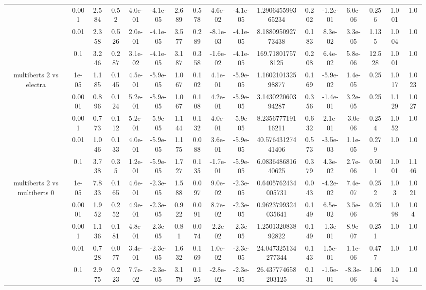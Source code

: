 \begin{tabular}{|c|c|c|c|c|c|c|c|c|c|c|c|c|c|c|c|c|}
 & 0.001 & 2.584 & 0.52 & 4.0e-01 & -4.1e-05 & 2.689 & 0.578 & 4.6e-02 & -4.1e-05 & 1.290645599365234 & 0.202 & -1.2e-01 & 6.0e-06 & 0.256 & 1.001 & 1.0 \\
 & 0.01 & 2.358 & 0.526 & 2.0e-01 & -4.1e-05 & 3.577 & 0.289 & -8.1e-03 & -4.1e-05 & 8.188095092773438 & 0.183 & 8.3e-02 & 3.3e-05 & 1.135 & 1.004 & 1.0 \\
 & 0.1 & 3.246 & 0.287 & 3.1e-02 & -4.1e-05 & 3.187 & 0.358 & -1.6e-02 & -4.1e-05 & 169.718017578125 & 0.208 & 6.4e-02 & 5.8e-06 & 12.528 & 1.001 & 1.0 \\
\hline
\multirow{5}{*}{multiberts 2 vs electra } & 1e-05 & 1.185 & 0.145 & 4.5e-01 & -5.9e-05 & 1.067 & 0.102 & 4.1e-01 & -5.9e-05 & 1.160210132598877 & 0.169 & -5.9e-02 & 1.4e-05 & 0.25 & 1.017 & 1.023 \\
 & 0.0001 & 0.896 & 0.124 & 5.2e-01 & -5.9e-05 & 1.067 & 0.108 & 4.2e-01 & -5.9e-05 & 3.143022060394287 & 0.356 & -1.4e-01 & 3.2e-05 & 0.25 & 1.129 & 1.027 \\
 & 0.001 & 0.773 & 0.112 & 5.2e-01 & -5.9e-05 & 1.144 & 0.132 & 4.0e-01 & -5.9e-05 & 8.235677719116211 & 0.632 & 2.1e-01 & -3.0e-06 & 0.254 & 1.052 & 1.0 \\
 & 0.01 & 1.046 & 0.133 & 4.0e-01 & -5.9e-05 & 1.175 & 0.088 & 3.6e-01 & -5.9e-05 & 40.57643127441406 & 0.573 & -3.5e-03 & 1.1e-05 & 0.279 & 1.0 & 1.0 \\
 & 0.1 & 3.738 & 0.35 & 1.2e-01 & -5.9e-05 & 1.727 & 0.135 & -1.7e-01 & -5.9e-05 & 6.083648681640625 & 0.379 & 4.3e-02 & 2.7e-06 & 0.501 & 1.001 & 1.146 \\
\hline
\multirow{5}{*}{multiberts 2 vs multiberts 0} & 1e-05 & 7.833 & 0.165 & 4.6e-01 & -2.3e-05 & 1.588 & 0.097 & 9.0e-02 & -2.3e-05 & 0.6405762434005731 & 0.043 & -4.2e-02 & 7.4e-07 & 0.252 & 1.03 & 1.021 \\
 & 0.0001 & 1.952 & 0.252 & 4.9e-01 & -2.3e-05 & 0.922 & 0.091 & 8.7e-02 & -2.3e-05 & 0.9623799324035641 & 0.149 & 6.5e-02 & 3.5e-06 & 0.25 & 1.098 & 1.04 \\
 & 0.001 & 1.136 & 0.181 & 4.8e-01 & -2.3e-05 & 0.81 & 0.074 & -2.2e-02 & -2.3e-05 & 1.250132083892822 & 0.149 & -1.3e-01 & 8.9e-07 & 0.251 & 1.0 & 1.0 \\
 & 0.01 & 0.728 & 0.077 & 3.4e-01 & -2.3e-05 & 1.632 & 0.169 & 1.0e-02 & -2.3e-05 & 24.047325134277344 & 0.143 & 1.5e-01 & 1.1e-06 & 0.477 & 1.0 & 1.0 \\
 & 0.1 & 2.975 & 0.223 & 7.7e-02 & -2.3e-05 & 3.179 & 0.125 & -2.8e-02 & -2.3e-05 & 26.437774658203125 & 0.131 & -1.5e-01 & -8.3e-06 & 1.064 & 1.014 & 1.0 \\

\end{tabular}
